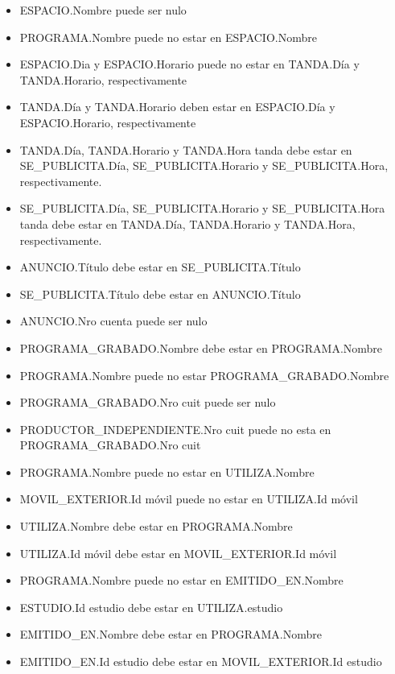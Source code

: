 \documentclass[a4paper,10pt]{article}
\begin{document}
    \begin{itemize}
     \item ESPACIO.Nombre puede ser nulo
     \item PROGRAMA.Nombre puede no estar en ESPACIO.Nombre
     
     \item ESPACIO.Dia y ESPACIO.Horario puede no estar en TANDA.D\'ia y TANDA.Horario, respectivamente
     \item TANDA.D\'ia y TANDA.Horario deben estar en ESPACIO.D\'ia y ESPACIO.Horario, respectivamente
     
     \item TANDA.D\'ia, TANDA.Horario y TANDA.Hora tanda debe estar en \newline SE\_PUBLICITA.D\'ia, SE\_PUBLICITA.Horario 
      y SE\_PUBLICITA.Hora, respectivamente.
     \item SE\_PUBLICITA.D\'ia, SE\_PUBLICITA.Horario y SE\_PUBLICITA.Hora \newline tanda debe estar en TANDA.D\'ia, TANDA.Horario 
      y TANDA.Hora, respectivamente.
     \item ANUNCIO.T\'itulo debe estar en SE\_PUBLICITA.T\'itulo
     \item SE\_PUBLICITA.T\'itulo debe estar en ANUNCIO.T\'itulo
     
     \item ANUNCIO.Nro cuenta puede ser nulo

     \item PROGRAMA\_GRABADO.Nombre debe estar en PROGRAMA.Nombre
     \item PROGRAMA.Nombre puede no estar PROGRAMA\_GRABADO.Nombre

     \item PROGRAMA\_GRABADO.Nro cuit puede ser nulo
     \item PRODUCTOR\_INDEPENDIENTE.Nro cuit puede no esta en PROGRAMA\_GRABADO.Nro cuit

     \item PROGRAMA.Nombre puede no estar en UTILIZA.Nombre
     \item MOVIL\_EXTERIOR.Id m\'ovil puede no estar en UTILIZA.Id m\'ovil
     \item UTILIZA.Nombre debe estar en PROGRAMA.Nombre
     \item UTILIZA.Id m\'ovil debe estar en MOVIL\_EXTERIOR.Id m\'ovil

     \item PROGRAMA.Nombre puede no estar en EMITIDO\_EN.Nombre
     \item ESTUDIO.Id estudio debe estar en UTILIZA.estudio
     \item EMITIDO\_EN.Nombre debe estar en PROGRAMA.Nombre
     \item EMITIDO\_EN.Id estudio debe estar en MOVIL\_EXTERIOR.Id estudio
    \end{itemize}
\end{document}
